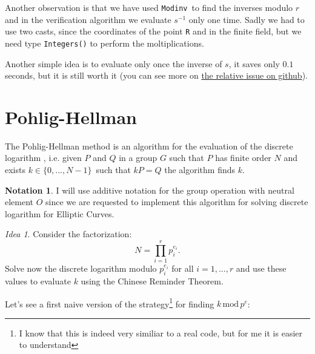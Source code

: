 \documentclass{article}
\theoremstyle{plain}
\theoremstyle{remark}
\newtheorem{idea}[rem]{Idea}
\theoremstyle{definition}
\newtheorem*{nota}{Notation}
\begin{document}
Another observation is that we have used \texttt{Modinv} to find the inverses modulo $r$ and in the verification algorithm we evaluate $s^{-1}$ only one time. Sadly we had to use two casts, since the coordinates of the point \texttt{R} and in the finite field, but we need type \texttt{Integers()} to perform the moltiplications. 



Another simple idea is to evaluate only once the inverse of $s$, it saves only $0.1$ seconds, but it is still worth it (you can see more on \href{https://github.com/giacomoborin/project2_MAGMA/issues/13}{the relative issue on github}).

\section{Pohlig-Hellman}

The Pohlig-Hellman method is an algorithm for the evaluation of the discrete logarithm %
, i.e. given $P$ and $Q$ in a group $G$ such that $P$ has finite order $N$ and exists $k\in \{0,...,N-1\}$ such that $kP = Q$ the algorithm finds $k$. 

\begin{nota}
	I will use additive notation for the group operation with neutral element $O$ since we are requested to implement this algorithm for solving discrete logarithm for Elliptic Curves. 
\end{nota}

\begin{idea} \label{idea:ecdlp}
	Consider the factorization:
\begin{equation*}
	N = \prod_{i=1}^r p_i^{e_i}.
\end{equation*}
	Solve now the discrete logarithm modulo $p_i^{e_i}$ for all $i = 1,...,r$ and use these values to evaluate $k$ using the Chinese Reminder Theorem. 
\end{idea}

Let's see a first naive version of the strategy\footnote{I know that this is indeed very similiar to a real code, but for me it is easier to understand} for finding $k \,\text{mod}\, p^e$:
\end{document}
